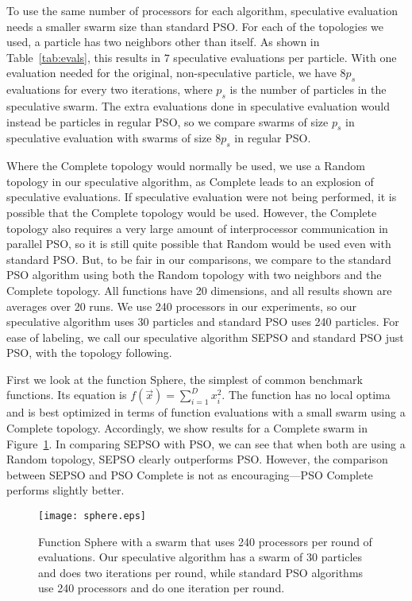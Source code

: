 \documentclass[journal,letterpaper]{IEEEtran}
\newcommand{\fig}[1]{Figure~\ref{fig:#1}}
\begin{document}
To use the same number of processors for each algorithm, speculative evaluation
needs a smaller swarm size than standard PSO.  For each of the topologies we
used, a particle has two neighbors other than itself.  As shown in
Table~\ref{tab:evals}, this results in $7$ speculative evaluations per
particle.  With one evaluation needed for the original, non-speculative
particle, we have $8p_s$ evaluations for every two iterations, where $p_s$ is
the number of particles in the speculative swarm.  The extra evaluations done
in speculative evaluation would instead be particles in regular PSO, so we
compare swarms of size $p_s$ in speculative evaluation with swarms of size
$8p_s$ in regular PSO.

Where the Complete topology would normally be used, we use a Random topology in
our speculative algorithm, as Complete leads to an explosion of speculative
evaluations.  If speculative evaluation were not being performed, it is
possible that the Complete topology would be used.  However, the Complete
topology also requires a very large amount of interprocessor communication in
parallel PSO, so it is still quite possible that Random would be used even with
standard PSO.  But, to be fair in our comparisons, we compare to the standard
PSO algorithm using both the Random topology with two neighbors and the
Complete topology.  All functions have 20 dimensions, and all results shown are
averages over 20 runs.  We use 240 processors in our experiments, so our
speculative algorithm uses 30 particles and standard PSO uses 240 particles.
For ease of labeling, we call our speculative algorithm SEPSO and standard PSO
just PSO, with the topology following.

First we look at the function Sphere, the simplest of common benchmark
functions.  Its equation is $f(\Vec{x}) = \sum_{i=1}^D x_i^2$.  The function
has no local optima and is best optimized in terms of function evaluations with
a small swarm using a Complete topology.  Accordingly, we show results for a
Complete swarm in \fig{basic-sphere}.  In comparing SEPSO with PSO, we can see
that when both are using a Random topology, SEPSO clearly outperforms PSO.
However, the comparison between SEPSO and PSO Complete is not as
encouraging---PSO Complete performs slightly better.

\begin{figure}
  \centering
  \texttt{[image: sphere.eps]}
  \caption{Function Sphere with a swarm that uses 240 processors per round of
  evaluations.  Our speculative algorithm has a swarm of 30 particles and does
  two iterations per round, while standard PSO algorithms use 240 processors
  and do one iteration per round.}
  \label{fig:basic-sphere}
\end{figure}
\end{document}
